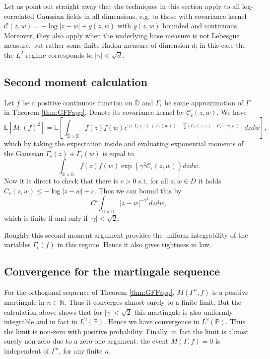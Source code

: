 \documentclass[11pt]{amsart}
\newcommand{\N}{\mathbb N}
\newcommand{\C}{\mathcal C}
\newcommand{\D}{\mathbb D}
\newcommand{\E}{\mathbb E}
\renewcommand{\P}{\mathbb P}
\renewcommand{\1}{\mathbf 1}
\newcommand{\eps}{\epsilon}
\begin{document}
Let us point out straight away that the techniques in this section apply to all log-correlated Gaussian fields in all dimensions, e.g. to those with covariance kernel $\C(z,w) = - \log |z-w| + g(z,w)$ with $g(z,w)$ bounded and continuous. Moreover, they also apply when the underlying base measure is not Lebesgue measure, but rather some finite Radon measure of dimension $d$; in this case the the $L^2$ regime corresponds to $|\gamma| < \sqrt{d}$.

\subsection*{Second moment calculation} Let $f$ be a positive continuous function on $\overline{\D}$ and $\Gamma_\eps$ be some approximation of $\Gamma$ in Theorem \ref{thm:GFFapp}. Denote its covariance kernel by $\C_\eps(z,w)$. We have $$\E\left[M_\eps(f)^2\right] = \E \left[\int_{\D \times \D}f(z)f(w)  e^{\gamma (\Gamma_\eps(z) + \Gamma_\eps(w)) - \frac{\gamma^2}{2}(\C_\eps(z,z) - \C_\eps(w,w))}dzdw\right],$$ 
which by taking the expectation inside and evaluating exponential moments of the Gaussian $\Gamma_\eps(z) + \Gamma_\eps(w)$ is equal to
$$\int_{\D \times \D}f(z)f(w)\exp(\gamma^2 \C_\eps(z,w)) dzdw.$$
Now it is direct to check that there is $c > 0$ s.t. for all $z,w \in D$ it holds $C_\eps(z,w) \leq -\log |z-w| + c$. Thus we can bound this by
$$C'\int_{\D \times \D}|z-w|^{-\gamma^2} dzdw,$$
which is finite if and only if $|\gamma| < \sqrt{2}$. 

Roughly this second moment argument provides the uniform integrability of the variables $\Gamma_\eps(f)$ in this regime. Hence it also gives tightness in law. 

\subsection*{Convergence for the martingale sequence}

For the orthogonal sequence of Theorem \ref{thm:GFFapp}, $M(\Gamma^n,f)$ is a positive martingale in $n \in \N$. Thus it converges almost surely to a finite limit. But the calculation above shows that for $|\gamma| < \sqrt{2}$ this martingale is also uniformly integrable and in fact in $L^2(\P)$. Hence we have convergence in $L^2(\P)$. Thus the limit is non-zero with positive probability. Finally, in fact the limit is almost surely non-zero due to a zero-one argument: the event $M(\Gamma,f) = 0$ is independent of $\Gamma^n$, for any finite $n$.
\end{document}
